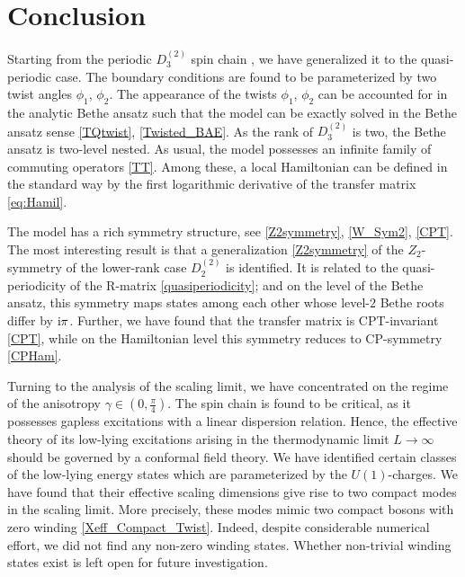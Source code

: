 \documentclass[12pt]{article}
\numberwithin{equation}{section}
\newcommand{\ri}{{\rm i}}
\begin{document}
\section{Conclusion}
Starting from the periodic $D^{(2)}_3$ spin chain \cite{Resh87}, we have generalized it to the quasi-periodic case. The boundary conditions are found to be parameterized by two twist angles $\phi_1$, $\phi_2$. The appearance of the twists $\phi_1$, $\phi_2$ can be accounted for in the analytic Bethe ansatz such that the model can be exactly solved in the Bethe ansatz sense \eqref{TQtwist}, \eqref{Twisted_BAE}. As the rank of $D^{(2)}_3$ is two, the Bethe ansatz is two-level nested. As usual, the model possesses an infinite family of commuting operators \eqref{TT}. Among these, a local Hamiltonian can be defined in the standard way by the first logarithmic derivative of the transfer matrix \eqref{eq:Hamil}. 

The model has a rich symmetry structure, see \eqref{Z2symmetry}, \eqref{W_Sym2}, \eqref{CPT}. The most interesting result is that a generalization \eqref{Z2symmetry} of the $Z_2$-symmetry of the lower-rank case $D^{(2)}_2$ is identified. It is related to the quasi-periodicity of the R-matrix \eqref{quasiperiodicity}; and on the level of the Bethe ansatz, this symmetry maps states among each other whose level-$2$ Bethe roots differ by $\ri \pi$. Further, we have found that the transfer matrix is CPT-invariant \eqref{CPT}, while on the Hamiltonian level this symmetry reduces to  CP-symmetry \eqref{CPHam}.

Turning to the analysis of the scaling limit, we have concentrated on the regime of the anisotropy $\gamma\in (0,\frac{\pi}{4})$. The spin chain is found to be critical, as it possesses gapless excitations with a linear dispersion relation. Hence, the effective theory of its low-lying excitations arising in the thermodynamic limit $L\to \infty$ should be governed by a conformal field theory. We have identified certain classes of the low-lying energy states which are parameterized by the $U(1)$-charges. We have found that their effective scaling dimensions give rise to two compact modes in the scaling limit. More precisely, these modes mimic two compact bosons with zero winding \eqref{Xeff_Compact_Twist}. Indeed, despite considerable numerical effort, we did not find any non-zero winding states. Whether non-trivial winding states exist is left open for future investigation. 
\end{document}
